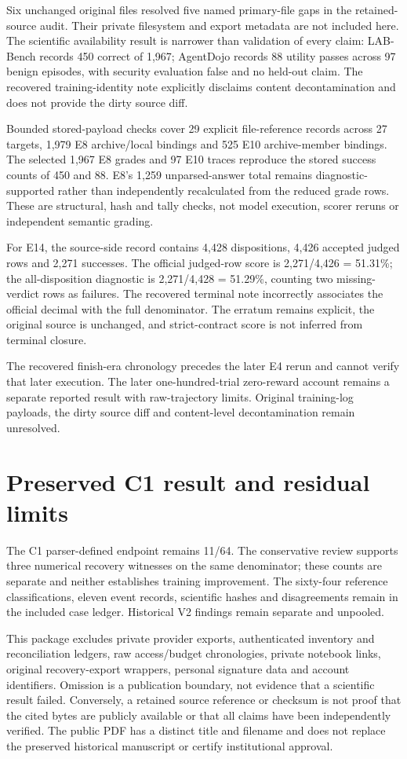 \documentclass[12pt,a4paper]{report}
\begin{document}
Six unchanged original files resolved five named primary-file gaps in
the retained-source audit. Their private filesystem and export metadata
are not included here. The scientific availability result is narrower
than validation of every claim: LAB-Bench records 450 correct of 1,967;
AgentDojo records 88 utility passes across 97 benign episodes, with
security evaluation false and no held-out claim. The recovered
training-identity note explicitly disclaims content decontamination and
does not provide the dirty source diff.

Bounded stored-payload checks cover 29 explicit file-reference records
across 27 targets, 1,979 E8 archive/local bindings and 525 E10
archive-member bindings. The selected 1,967 E8 grades and 97 E10 traces
reproduce the stored success counts of 450 and 88. E8's 1,259
unparsed-answer total remains diagnostic-supported rather than
independently recalculated from the reduced grade rows. These are
structural, hash and tally checks, not model execution, scorer reruns or
independent semantic grading.

For E14, the source-side record contains 4,428 dispositions, 4,426
accepted judged rows and 2,271 successes. The official judged-row score
is 2,271/4,426 = 51.31\%; the all-disposition diagnostic is 2,271/4,428
= 51.29\%, counting two missing-verdict rows as failures. The recovered
terminal note incorrectly associates the official decimal with the full
denominator. The erratum remains explicit, the original source is
unchanged, and strict-contract score is not inferred from terminal
closure.

The recovered finish-era chronology precedes the later E4 rerun and
cannot verify that later execution. The later one-hundred-trial
zero-reward account remains a separate reported result with
raw-trajectory limits. Original training-log payloads, the dirty source
diff and content-level decontamination remain unresolved.

\section{Preserved C1 result and residual
limits}\label{preserved-c1-result-and-residual-limits}

The C1 parser-defined endpoint remains 11/64. The conservative review
supports three numerical recovery witnesses on the same denominator;
these counts are separate and neither establishes training improvement.
The sixty-four reference classifications, eleven event records,
scientific hashes and disagreements remain in the included case ledger.
Historical V2 findings remain separate and unpooled.

This package excludes private provider exports, authenticated inventory
and reconciliation ledgers, raw access/budget chronologies, private
notebook links, original recovery-export wrappers, personal signature
data and account identifiers. Omission is a publication boundary, not
evidence that a scientific result failed. Conversely, a retained source
reference or checksum is not proof that the cited bytes are publicly
available or that all claims have been independently verified. The
public PDF has a distinct title and filename and does not replace the
preserved historical manuscript or certify institutional approval.
\end{document}
